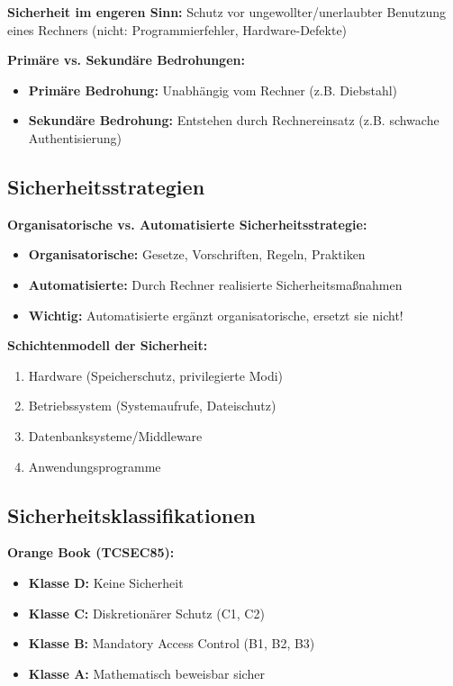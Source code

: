 \documentclass[9pt,a4paper]{extarticle}
\begin{document}
\begin{multicols*}{2}
\textbf{Sicherheit im engeren Sinn:} Schutz vor ungewollter/unerlaubter Benutzung eines Rechners (nicht: Programmierfehler, Hardware-Defekte)

\textbf{Primäre vs. Sekundäre Bedrohungen:}
\begin{itemize}
\item \textbf{Primäre Bedrohung:} Unabhängig vom Rechner (z.B. Diebstahl)
\item \textbf{Sekundäre Bedrohung:} Entstehen durch Rechnereinsatz (z.B. schwache Authentisierung)
\end{itemize}

\subsection{Sicherheitsstrategien}
\textbf{Organisatorische vs. Automatisierte Sicherheitsstrategie:}
\begin{itemize}
\item \textbf{Organisatorische:} Gesetze, Vorschriften, Regeln, Praktiken
\item \textbf{Automatisierte:} Durch Rechner realisierte Sicherheitsmaßnahmen
\item \textbf{Wichtig:} Automatisierte ergänzt organisatorische, ersetzt sie nicht!
\end{itemize}

\textbf{Schichtenmodell der Sicherheit:}
\begin{enumerate}
\item Hardware (Speicherschutz, privilegierte Modi)
\item Betriebssystem (Systemaufrufe, Dateischutz)
\item Datenbanksysteme/Middleware
\item Anwendungsprogramme
\end{enumerate}

\subsection{Sicherheitsklassifikationen}
\textbf{Orange Book (TCSEC85):}
\begin{itemize}
\item \textbf{Klasse D:} Keine Sicherheit
\item \textbf{Klasse C:} Diskretionärer Schutz (C1, C2)
\item \textbf{Klasse B:} Mandatory Access Control (B1, B2, B3)
\item \textbf{Klasse A:} Mathematisch beweisbar sicher
\end{itemize}


\end{multicols*}
\end{document}
